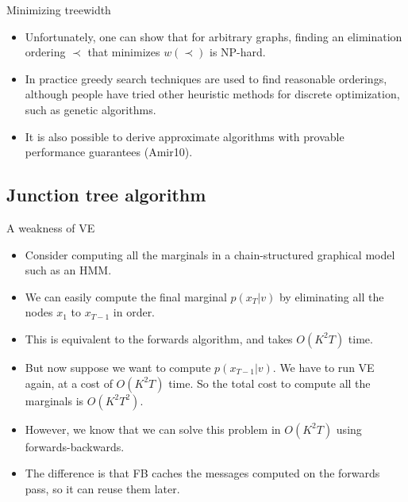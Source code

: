 \documentclass[10pt,mathserif]{beamer}
\begin{document}
\begin{frame}{Minimizing treewidth}
\begin{itemize}
    \item  Unfortunately, one can show that for arbitrary graphs, finding an elimination ordering $\prec$ that minimizes $w(\prec)$ is NP-hard.
    \item In practice greedy search techniques are used to find reasonable orderings, although people have tried other heuristic methods for discrete optimization, such as genetic algorithms.
    \item It is also possible to derive approximate algorithms with provable performance guarantees (Amir10).
\end{itemize}
\end{frame}

\subsection{Junction tree algorithm}
\begin{frame}{A weakness of VE}
\begin{itemize}
    \item Consider computing all the marginals in a chain-structured graphical model such as an HMM.
    \item We can easily compute the final marginal $p(x_T |v)$ by eliminating all the nodes $x_1$ to $x_{T-1}$ in order.
    \item This is equivalent to the forwards algorithm, and takes $O(K^2T)$ time.
    \item But now suppose we want to compute $p(x_{T-1}|v)$. We have to run VE again, at a cost of $O(K^2T)$ time. So the total cost to compute all the marginals is $O(K^2T^2)$.
    \item However, we know that we can solve this problem in $O(K^2T)$ using forwards-backwards.
    \item The difference is that FB caches the messages computed on the forwards pass, so it can reuse them later.
\end{itemize}
\end{frame}
\end{document}
